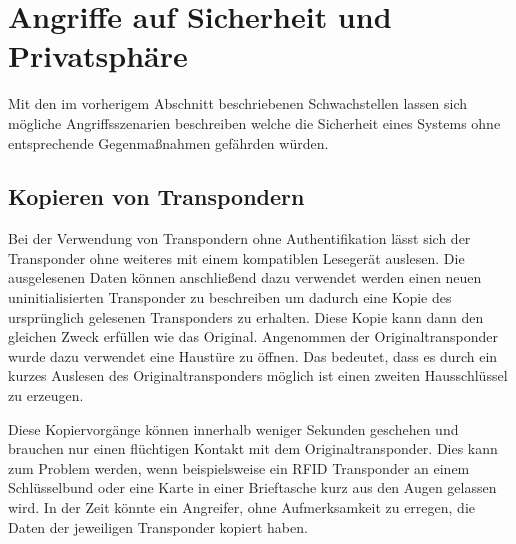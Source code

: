 \documentclass[conference]{IEEEtran}
\begin{document}
\section{Angriffe auf Sicherheit und Privatsphäre}
Mit den im vorherigem Abschnitt beschriebenen Schwachstellen lassen sich mögliche Angriffsszenarien beschreiben welche die Sicherheit eines Systems ohne entsprechende Gegenmaßnahmen gefährden würden.

\subsection{Kopieren von Transpondern}
Bei der Verwendung von Transpondern ohne Authentifikation lässt sich der Transponder ohne weiteres mit einem kompatiblen Lesegerät auslesen. Die ausgelesenen Daten können anschließend dazu verwendet werden einen neuen uninitialisierten Transponder zu beschreiben um dadurch eine Kopie des ursprünglich gelesenen Transponders zu erhalten. Diese Kopie kann dann den gleichen Zweck erfüllen wie das Original. Angenommen der Originaltransponder wurde dazu verwendet eine Haustüre zu öffnen. Das bedeutet, dass es durch ein kurzes Auslesen des Originaltransponders möglich ist einen zweiten Hausschlüssel zu erzeugen. 

Diese Kopiervorgänge können innerhalb weniger Sekunden geschehen und brauchen nur einen flüchtigen Kontakt mit dem Originaltransponder. Dies kann zum Problem werden, wenn beispielsweise ein RFID Transponder an einem Schlüsselbund oder eine Karte in einer Brieftasche kurz aus den Augen gelassen wird. In der Zeit könnte ein Angreifer, ohne Aufmerksamkeit zu erregen, die Daten der jeweiligen Transponder kopiert haben.
\end{document}
